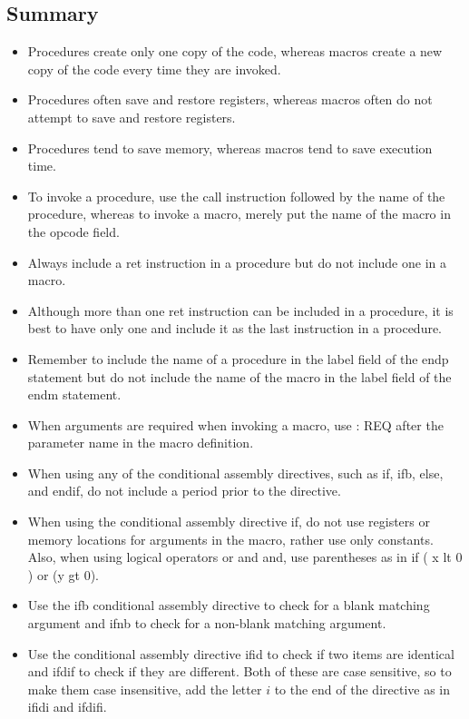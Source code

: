 \documentclass[10pt]{book}
\begin{document}
\subsection{Summary}
\begin{itemize}
  \item Procedures create only one copy of the code, whereas macros create a new copy of the code every time they are invoked.
  \item Procedures often save and restore registers, whereas macros often do not attempt to save and restore registers.
  \item Procedures tend to save memory, whereas macros tend to save execution time.
  \item To invoke a procedure, use the call instruction followed by the name of the procedure, whereas to invoke a macro, merely put the name of the macro in the opcode field.
  \item Always include a ret instruction in a procedure but do not include one in a macro.
  \item Although more than one ret instruction can be included in a procedure, it is best to have only one and include it as the last instruction in a procedure.
  \item Remember to include the name of a procedure in the label field of the endp statement but do not include the name of the macro in the label field of the endm statement.
  \item When arguments are required when invoking a macro, use : REQ after the parameter name in the macro definition.
  \item When using any of the conditional assembly directives, such as if, ifb, else, and endif, do not include a period prior to the directive.
  \item When using the conditional assembly directive if, do not use registers or memory locations for arguments in the macro, rather use only constants. Also, when using logical operators or and and, use parentheses as in if ( x lt 0 ) or (y gt 0).
  \item Use the ifb conditional assembly directive to check for a blank matching argument and ifnb to check for a non-blank matching argument.
  \item Use the conditional assembly directive ifid to check if two items are identical and ifdif to check if they are different. Both of these are case sensitive, so to make them case insensitive, add the letter $i$ to the end of the directive as in ifidi and ifdifi.
\end{itemize}
\end{document}
